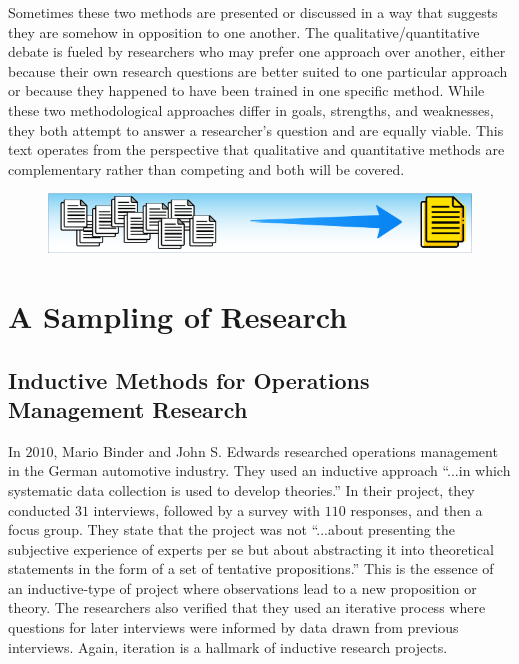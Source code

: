 Sometimes these two methods are presented or discussed in a way that suggests they are somehow in opposition to one another. The qualitative/quantitative debate is fueled by researchers who may prefer one approach over another, either because their own research questions are better suited to one particular approach or because they happened to have been trained in one specific method. While these two methodological approaches differ in goals, strengths, and weaknesses, they both attempt to answer a researcher's question and are equally viable. This text operates from the perspective that qualitative and quantitative methods are complementary rather than competing and both will be covered. 

\noindent\begin{minipage}{\textwidth}
\begin{figure}[H]
	\centering
	\includegraphics[width=.85\linewidth]{gfx/Sampling_Of_Research}
	\caption*{}
	\label{01:sampling_of_research}
\end{figure}
\vspace{-10.0ex} %
\section{A Sampling of Research}
\end{minipage}

\subsection{Inductive Methods for Operations Management Research}

In $ 2010 $, Mario Binder and John S. Edwards researched operations management in the German automotive industry\cite{binder2010using}. They used an inductive approach ``...in  which  systematic  data collection is used to develop theories.'' In their project, they conducted $ 31 $ interviews, followed by a survey with $ 110 $ responses, and then a focus group. They state that the project was not ``...about  presenting  the  subjective experience of experts per se but about abstracting it into theoretical statements in the form of a set of tentative propositions.'' This is the essence of an inductive-type of project where observations lead to a new proposition or theory. The researchers also verified that they used an iterative process where questions for later interviews were informed by data drawn from previous interviews. Again, iteration is a hallmark of inductive research projects.

